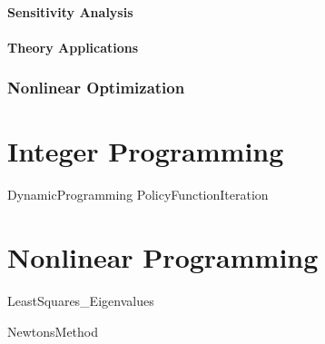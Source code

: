 \subsection{Sensitivity Analysis} 


\subsection{Theory Applications} 


\newpage \section{Nonlinear Optimization}

\newcommand{\tred}[1]{#1}
\newcommand{\tblue}[1]{#1}
\newcommand{\Z}{\mathbb{Z}}
\part{Integer Programming}
%
{DynamicProgramming}
{PolicyFunctionIteration}

\part{Nonlinear Programming}
{LeastSquares_Eigenvalues}

{NewtonsMethod}

